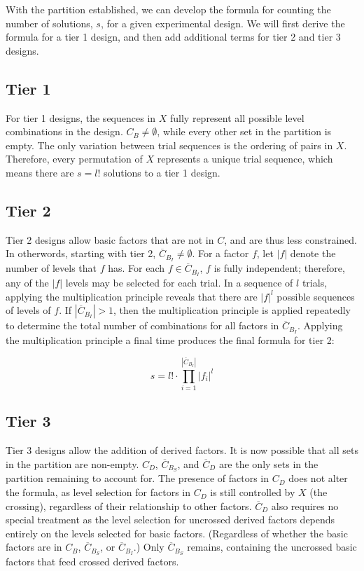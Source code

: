With the partition established, we can develop the formula for counting the number of solutions, $s$, for a given experimental design. We will first derive the formula for a tier 1 design, and then add additional terms for tier 2 and tier 3 designs.

\subsection{Tier 1}

For tier 1 designs, the sequences in $X$ fully represent all possible level combinations in the design. $C_B \neq \emptyset$, while every other set in the partition is empty. The only variation between trial sequences is the ordering of pairs in $X$. Therefore, every permutation of $X$ represents a unique trial sequence, which means there are $s = l!$ solutions to a tier 1 design.

\subsection{Tier 2}

Tier 2 designs allow basic factors that are not in $C$, and are thus less constrained. In otherwords, starting with tier 2, $\overline{C}_{B_I} \neq \emptyset$. For a factor $f$, let $|f|$ denote the number of levels that $f$ has. For each $f \in \overline{C}_{B_I}$, $f$ is fully independent; therefore, any of the $|f|$ levels may be selected for each trial. In a sequence of $l$ trials, applying the multiplication principle reveals that there are $|f|^l$ possible sequences of levels of $f$. If $|\overline{C}_{B_I}| > 1$, then the multiplication principle is applied repeatedly to determine the total number of combinations for all factors in $\overline{C}_{B_I}$. Applying the multiplication principle a final time produces the final formula for tier 2:

\[
s = l! \cdot \prod_{i=1}^{|\overline{C}_{B_I}|} |f_i|^l
\]

\subsection{Tier 3}

Tier 3 designs allow the addition of derived factors. It is now possible that all sets in the partition are non-empty. $C_D$, $\overline{C}_{B_S}$, and $\overline{C}_D$ are the only sets in the partition remaining to account for. The presence of factors in $C_D$ does not alter the formula, as level selection for factors in $C_D$ is still controlled by $X$ (the crossing), regardless of their relationship to other factors. $\overline{C}_D$ also requires no special treatment as the level selection for uncrossed derived factors depends entirely on the levels selected for basic factors. (Regardless of whether the basic factors are in $C_B$, $\overline{C}_{B_S}$, or $\overline{C}_{B_I}$.) Only $\overline{C}_{B_S}$ remains, containing the uncrossed basic factors that feed crossed derived factors.

